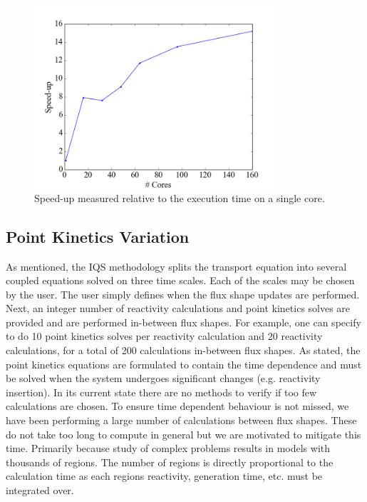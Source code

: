 \documentclass{anstrans}
\begin{document}
\begin{figure}[h]
    \centering
    \includegraphics[width=9cm]{figures/speedup.png}
    \caption{Speed-up measured relative to the execution time on a single core.}
    \label{fig:speedup}
\end{figure}


\subsection{Point Kinetics Variation}
As mentioned, the IQS methodology  splits the transport equation into several coupled equations solved on three time scales.  Each of the scales may be chosen by the user.  The user simply defines when the flux shape updates are performed.  Next, an integer number of reactivity calculations and point kinetics solves are provided and are performed in-between flux shapes.  For example, one can specify to do 10 point kinetics solves per reactivity calculation and 20 reactivity calculations, for a total of 200 calculations in-between flux shapes.  As stated, the point kinetics equations are formulated to contain the time dependence and must be solved when the system undergoes significant changes (e.g. reactivity insertion).  In its current state there are no methods to verify if too few calculations are chosen. To ensure time dependent behaviour is not missed, we have been performing a large number of calculations between flux shapes.  These do not take too long to compute in general but we are motivated to mitigate this time.  Primarily because study of complex problems results in models with thousands of regions. The number of regions is directly proportional to the calculation time as each regions reactivity, generation time, etc. must be integrated over.  
\end{document}
